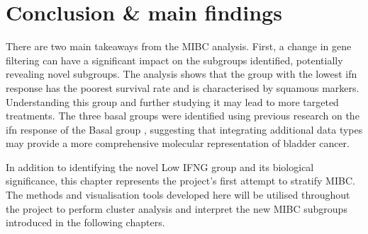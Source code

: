 \section{Conclusion \& main findings}

There are two main takeaways from the MIBC analysis. First, a change in gene filtering can have a significant impact on the subgroups identified, potentially revealing novel subgroups. The analysis shows that the group with the lowest \acrfull{ifn} response has the poorest survival rate and is characterised by squamous markers. Understanding this group and further studying it may lead to more targeted treatments. The three basal groups were identified using previous research on the \acrshort{ifn} response of the Basal group \citep{Marzouka2018-ge,Baker2022-bj}, suggesting that integrating additional data types may provide a more comprehensive molecular representation of bladder cancer.

In addition to identifying the novel Low IFNG group and its biological significance, this chapter represents the project's first attempt to stratify MIBC. The methods and visualisation tools developed here will be utilised throughout the project to perform cluster analysis and interpret the new MIBC subgroups introduced in the following chapters.
